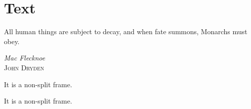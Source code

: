 \chapter{Text}
\label{ch:ch2}

\epigraph{All human things are subject to decay, and when fate summons, Monarchs must obey.}{\textit{Mac Flecknoe} \\ \textsc{John Dryden}}

\begin{notice}
	It is a non-split frame.
\end{notice}

\begin{notice}
	\lipsum[6-7]
\end{notice}

\lipsum[8]

\begin{highlight}[Problem 1]
	It is a non-split frame.
\end{highlight}

\lipsum[9]

\begin{highlight}[Problem 2]
	\lipsum[10-12]
\end{highlight}